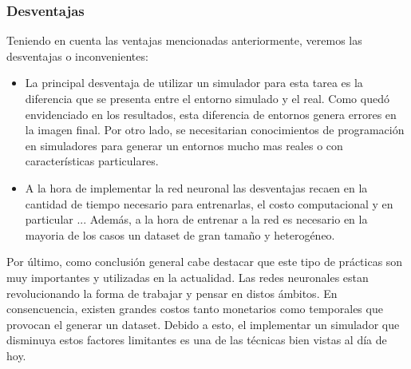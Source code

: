 \documentclass[]{IEEEtran}
\begin{document}
    \subsubsection{Desventajas}
    Teniendo en cuenta las ventajas mencionadas anteriormente, veremos las desventajas o inconvenientes:
    \begin{itemize}
        \item La principal desventaja de utilizar un simulador para esta tarea es la diferencia que se presenta entre el entorno simulado y el real.
        Como quedó envidenciado en los resultados, esta diferencia de entornos genera errores en la imagen final. Por otro lado, se necesitarian 
        conocimientos de programación en simuladores para generar un entornos mucho mas reales o con características particulares. 
        \item A la hora de implementar la red neuronal las desventajas recaen en la cantidad de tiempo necesario para entrenarlas, el costo computacional 
        y en particular ... %
        Además, a la hora de entrenar a la red es necesario en la mayoria de los casos un dataset de gran tamaño y heterogéneo. 
    \end{itemize}


    Por último, como conclusión general cabe destacar que este tipo de prácticas son muy importantes y utilizadas en la actualidad. Las redes neuronales 
    estan revolucionando la forma de trabajar y pensar en distos ámbitos. En consencuencia, existen grandes costos tanto monetarios como temporales que provocan el generar un
    dataset. Debido a esto, el implementar un simulador que disminuya estos factores limitantes es una de las técnicas bien vistas al día de hoy.


    
    
\end{document}
